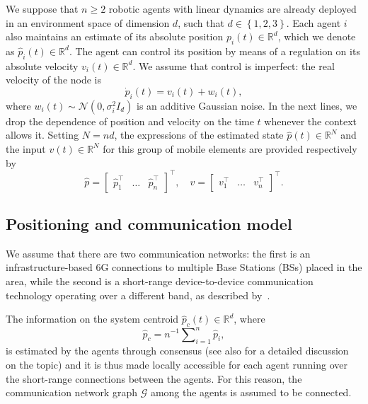 \documentclass{ifac/ifacconf}
\begin{document}
We suppose that $n\geq 2$ robotic agents with linear dynamics are already deployed in an environment space of dimension $d$, such that $d\in \left\lbrace 1,2,3\right\rbrace$. 
Each agent $i$ also maintains an estimate of its absolute position $p_{i}(t) \in \mathbb{R}^{d}$, which we denote as $\hat{p}_{i}(t) \in \mathbb{R}^{d}$. The agent can control its position by means of a regulation on its absolute velocity $v_{i}(t)\in \mathbb{R}^{d}$. We assume that control is imperfect: the real velocity of the node is
\begin{equation}\label{eq:imperfect_vel}
    \dot{p}_i(t)=v_i(t)+w_i(t),
\end{equation}
where $w_i(t)\sim\mathcal{N}(0,\sigma_i^2 I_d)$ is an additive Gaussian noise.
In the next lines, we drop the dependence of position and velocity on the time $t$ whenever the context allows it.
Setting $N=nd$, the expressions of the estimated state $\hat{p}(t)\in \mathbb{R}^{N}$ and the input $v(t)\in \mathbb{R}^{N}$ for this group of mobile elements are provided respectively by
\begin{equation}
	\hat{p} = \begin{bmatrix}
		\hat{p}_{1}^{\top} & \dots & \hat{p}_{n}^{\top} 
	\end{bmatrix}^{\top},\quad
	v = 
	\begin{bmatrix}
        v_{1}^{\top} & \dots & v_{n}^{\top}
	\end{bmatrix}^{\top}.
\end{equation}


\subsection{Positioning and communication model}

We assume that there are two communication networks: the first is an infrastructure-based 6G connections to multiple Base Stations (BSs) placed in the area, while the second is a short-range device-to-device communication technology operating over a different band, as described by~\cite{azari2020uav}.

The information on the system centroid  $\hat{p}_c(t) \in \mathbb{R}^d$, where
\begin{equation}
    \hat{p}_c = n^{-1} \sum\nolimits_{i=1}^n \hat{p}_i,
\end{equation}
is estimated by the agents through consensus (see also \cite{bullo2018lectures} for a detailed discussion on the topic) and it is thus made locally accessible for each agent running over the short-range connections between the agents. For this reason, the communication network graph $\mathcal{G}$ among the agents is assumed to be connected. 
\end{document}
